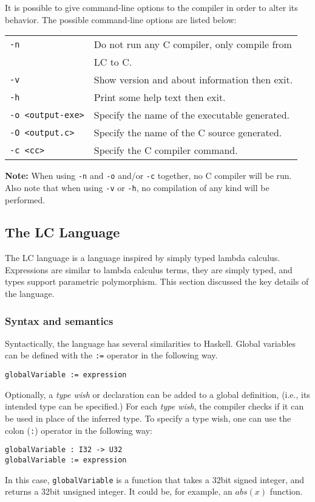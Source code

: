 \documentclass[12pt]{article}
\begin{document}
It is possible to give command-line options to the compiler in order to alter
its behavior. The possible command-line options are listed below:

\vspace{7pt}

\begin{tabular}{l l}
    \texttt{-n}\quad& Do not run any C compiler, only compile from \\ 
                    & LC to C. \\
    \texttt{-v}\quad& Show version and about information then exit. \\
    \texttt{-h}\quad& Print some help text then exit. \\
    \texttt{-o <output-exe>}\quad& Specify the name of the executable
        generated. \\
    \texttt{-O <output.c>}\quad& Specify the name of the C source generated. \\
    \texttt{-c <cc>}\quad& Specify the C compiler command.
\end{tabular}

\vspace{8pt}

\textbf{Note:} When using \texttt{-n} and \texttt{-o} and/or \texttt{-c} together,
no C compiler will be run. Also note that when using \texttt{-v} or \texttt{-h},
no compilation of any kind will be performed. 

\subsection{The LC Language}

The LC language is a language inspired by simply typed lambda calculus.
Expressions are similar to lambda calculus terms, they are simply typed, and
types support parametric polymorphism. This section discussed the key details of
the language.

\subsubsection{Syntax and semantics}

Syntactically, the language has several similarities to Haskell. Global
variables can be defined with the \texttt{:=} operator in the following way.
\begin{lstlisting}
globalVariable := expression
\end{lstlisting}
Optionally, a \emph{type wish} or declaration can be added to a global
definition, (i.e., its intended type can be specified.) For each \emph{type
wish}, the compiler checks if it can be used in place of the inferred type. To
specify a type wish, one can use the colon (\verb$:$) operator in the following
way:
\begin{lstlisting}
globalVariable : I32 -> U32
globalVariable := expression
\end{lstlisting}
In this case, \verb$globalVariable$ is a function that takes a 32bit signed
integer, and returns a 32bit unsigned integer. It could be, for example, an
$abs(x)$ function.
\end{document}

